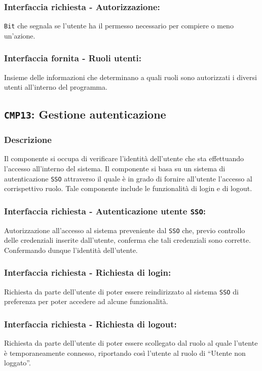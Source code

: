         \subsubsection{Interfaccia richiesta - Autorizzazione:}
            \texttt{Bit} che segnala se l'utente ha il permesso necessario per compiere o meno un'azione.
        \subsubsection{Interfaccia fornita - Ruoli utenti:}
            Insieme delle informazioni che determinano a quali ruoli sono autorizzati i diversi utenti all'interno del programma.

    \subsection{\texttt{CMP13}: Gestione autenticazione}
        \subsubsection{Descrizione}
            Il componente si occupa di verificare l'identità dell'utente che sta effettuando l'accesso all'interno del sistema. Il componente si basa su un sistema di autenticazione \texttt{SSO} attraverso il quale è in grado di fornire all'utente l'accesso al corrispettivo ruolo. Tale componente include le funzionalità di login e di logout.
        \subsubsection{Interfaccia richiesta - Autenticazione utente \texttt{SSO}:}
            Autorizzazione all'accesso al sistema preveniente dal \texttt{SSO} che, previo controllo delle credenziali inserite dall'utente, conferma che tali credenziali sono corrette. Confermando dunque l'identità dell'utente.
        \subsubsection{Interfaccia richiesta - Richiesta di login:}
            Richiesta da parte dell'utente di poter essere reindirizzato al sistema \texttt{SSO} di preferenza per poter accedere ad alcune funzionalità.
        \subsubsection{Interfaccia richiesta - Richiesta di logout:}
            Richiesta da parte dell'utente di poter essere scollegato dal ruolo al quale l'utente è temporaneamente connesso, riportando così l'utente al ruolo di ``Utente non loggato''.
